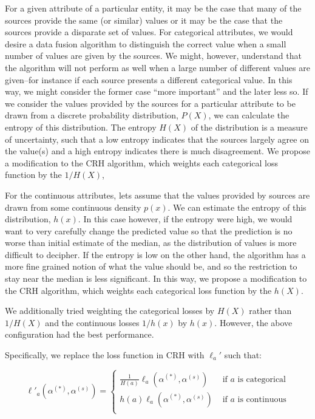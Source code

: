 \documentclass{acm_proc_article-sp}
\begin{document}
For a given attribute of a particular entity, it may be the case that many of the sources provide the same (or similar) values or it may be the case that the sources provide a disparate set of values. For categorical attributes, we would desire a data fusion algorithm to distinguish the correct value when a small number of values are given by the sources. We might, however, understand that the algorithm will not perform as well when a large number of different values are given--for instance if each source presents a different categorical value. In this way, we might consider the former case ``more important'' and the later less so. If we consider the values provided by the sources for a particular attribute to be drawn from a discrete probability distribution, $P(X)$, we can calculate the entropy of this distribution. The entropy $H(X)$ of the distribution is a measure of uncertainty, such that a low entropy indicates that the sources largely agree on the value(s) and a high entropy indicates there is much disagreement. We propose a modification to the CRH algorithm, which weights each categorical loss function by the $1 / H(X)$,  

For the continuous attributes, lets assume that the values provided by sources are drawn from some continuous density $p(x)$. We can estimate the entropy of this distribution, $h(x)$. In this case however, if the entropy were high, we would want to very carefully change the predicted value so that the prediction is no worse than initial estimate of the median, as the distribution of values is more difficult to decipher. If the entropy is low on the other hand, the algorithm has a more fine grained notion of what the value should be, and so the restriction to stay near the median is less significant. In this way, we propose a modification to the CRH algorithm, which weights each categorical loss function by the $h(X)$.

We additionally tried weighting the categorical losses by $H(X)$ rather than $1/H(X)$ and the continuous losses  $1/h(x)$ by $h(x)$. However, the above configuration had the best performance. 

Specifically, we replace the loss function in CRH with $\ell_a'$ such that: 

\begin{equation}
\ell'_a(\alpha^{(*)}, \alpha^{(s)}) = \left\{
     \begin{array}{lr}
       \frac{1}{H(a)} \ell_a(\alpha^{(*)}, \alpha^{(s)})  & \text{ if $a$ is categorical} \\
       h(a) \ell_a(\alpha^{(*)}, \alpha^{(s)})  & \text{ if $a$ is continuous} \\
     \end{array}
   \right.
\end{equation}
\end{document}
